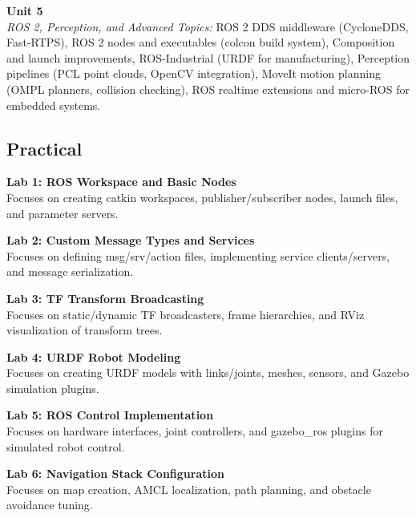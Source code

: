 \vspace{0.3cm}

\noindent\textbf{Unit 5} \\
\textit{ROS 2, Perception, and Advanced Topics:} ROS 2 DDS middleware (CycloneDDS, Fast-RTPS), ROS 2 nodes and executables (colcon build system), Composition and launch improvements, ROS-Industrial (URDF for manufacturing), Perception pipelines (PCL point clouds, OpenCV integration), MoveIt motion planning (OMPL planners, collision checking), ROS realtime extensions and micro-ROS for embedded systems.

\newpage

\subsection*{Practical}
\noindent\textbf{Lab 1: ROS Workspace and Basic Nodes} \\
Focuses on creating catkin workspaces, publisher/subscriber nodes, launch files, and parameter servers.

\vspace{0.2cm}

\noindent\textbf{Lab 2: Custom Message Types and Services} \\
Focuses on defining msg/srv/action files, implementing service clients/servers, and message serialization.

\vspace{0.2cm}

\noindent\textbf{Lab 3: TF Transform Broadcasting} \\
Focuses on static/dynamic TF broadcasters, frame hierarchies, and RViz visualization of transform trees.

\vspace{0.2cm}

\noindent\textbf{Lab 4: URDF Robot Modeling} \\
Focuses on creating URDF models with links/joints, meshes, sensors, and Gazebo simulation plugins.

\vspace{0.2cm}

\noindent\textbf{Lab 5: ROS Control Implementation} \\
Focuses on hardware interfaces, joint controllers, and gazebo\_ros plugins for simulated robot control.

\vspace{0.2cm}

\noindent\textbf{Lab 6: Navigation Stack Configuration} \\
Focuses on map creation, AMCL localization, path planning, and obstacle avoidance tuning.


